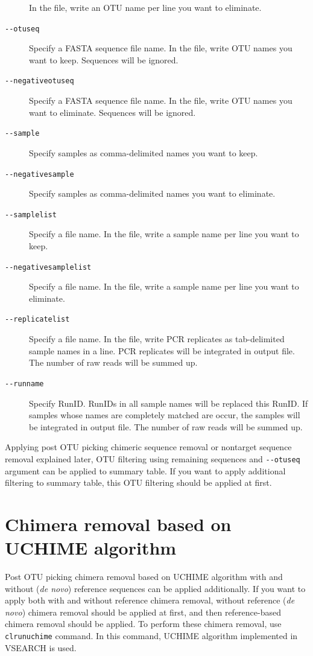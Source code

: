 \documentclass[titlepage,10pt,a4paper,english]{jsbook}
\begin{document}
\begin{description}
In the file, write an OTU name per line you want to eliminate.
\item[\texttt{{-}{-}otuseq}] Specify a FASTA sequence file name.
In the file, write OTU names you want to keep. Sequences will be ignored.
\item[\texttt{{-}{-}negativeotuseq}] Specify a FASTA sequence file name.
In the file, write OTU names you want to eliminate. Sequences will be ignored.
\item[\texttt{{-}{-}sample}] Specify samples as comma-delimited names you want to keep.
\item[\texttt{{-}{-}negativesample}] Specify samples as comma-delimited names you want to eliminate.
\item[\texttt{{-}{-}samplelist}] Specify a file name.
In the file, write a sample name per line you want to keep.
\item[\texttt{{-}{-}negativesamplelist}] Specify a file name.
In the file, write a sample name per line you want to eliminate.
\item[\texttt{{-}{-}replicatelist}] Specify a file name.
In the file, write PCR replicates as tab-delimited sample names in a line.
PCR replicates will be integrated in output file.
The number of raw reads will be summed up.
\item[\texttt{{-}{-}runname}] Specify RunID.
RunIDs in all sample names will be replaced this RunID.
If samples whose names are completely matched are occur, the samples will be integrated in output file.
The number of raw reads will be summed up.
\end{description}

Applying post OTU picking chimeric sequence removal or nontarget sequence removal explained later, OTU filtering using remaining sequences and \texttt{{-}{-}otuseq} argument can be applied to summary table.
If you want to apply additional filtering to summary table, this OTU filtering should be applied at first.

\section{Chimera removal based on UCHIME algorithm}

Post OTU picking chimera removal based on UCHIME algorithm with and without (\textit{de novo}) reference sequences can be applied additionally.
If you want to apply both with and without reference chimera removal, without reference (\textit{de novo}) chimera removal should be applied at first, and then reference-based chimera removal should be applied.
To perform these chimera removal, use \texttt{clrunuchime} command.
In this command, UCHIME algorithm implemented in VSEARCH is used.
\end{document}

